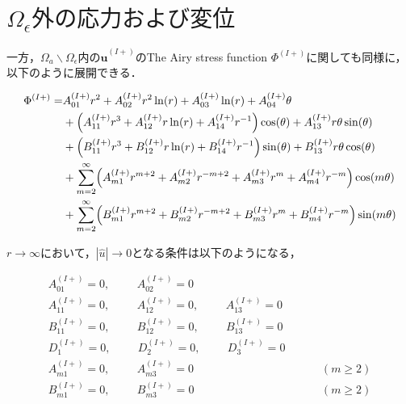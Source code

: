 \section{$\Omega_{\epsilon}外の応力および変位$}

一方，$\Omega_{a}\backslash\Omega_\epsilon$内の$\hat{\bm{u}}^{(I+)}$のThe Airy stress function $\Phi^{(I+)}$に関しても同様に，以下のように展開できる．

\begin{align}
\Phi^{(I+)} =&A_{01}^{(I+)}r^2+A_{02}^{(I+)}r^2\ln(r)+A_{03}^{(I+)}\ln(r)+A_{04}^{(I+)}\theta
\nonumber
\\
&+\Bigl(A_{11}^{(I+)}r^3+A_{12}^{(I+)}r\ln(r)+A_{14}^{(I+)}r^{-1}\Bigr)\cos(\theta)+A_{13}^{(I+)}r\theta \sin(\theta)
\nonumber
\\
&+\Bigl(B_{11}^{(I+)}r^3+B_{12}^{(I+)}r\ln(r)+B_{14}^{(I+)}r^{-1}\Bigr)\sin(\theta)+B_{13}^{(I+)}r\theta \cos(\theta)
\nonumber
\\
&+\sum_{m=2}^{\infty}\Bigl(A_{m1}^{(I+)}r^{m+2}+A_{m2}^{(I+)}r^{-m+2}
+A_{m3}^{(I+)}r^{m}+A_{m4}^{(I+)}r^{-m}\Bigr)\cos(m\theta)
\nonumber
\\
&+\sum_{m=2}^{\infty}\Bigl(B_{m1}^{(I+)}r^{m+2}+B_{m2}^{(I+)}r^{-m+2}
+B_{m3}^{(I+)}r^{m}+B_{m4}^{(I+)}r^{-m}\Bigr)\sin(m\theta)
\label{eq:AiryOut1}
\end{align}


$r\rightarrow\infty$において，$|\hat{u}|\rightarrow0$となる条件は以下のようになる，

\begin{align}
A_{01}^{(I+)}=0,\hspace{1cm}A_{02}^{(I+)}=0&
\nonumber
\\
A_{11}^{(I+)}=0,\hspace{1cm}A_{12}^{(I+)}=0,\hspace{1cm}A_{13}^{(I+)}=0&
\nonumber
\\
B_{11}^{(I+)}=0,\hspace{1cm}B_{12}^{(I+)}=0,\hspace{1cm}B_{13}^{(I+)}=0&
\nonumber
\\
D_{1}^{(I+)}=0,\hspace{1cm}
D_{2}^{(I+)}=0,\hspace{1cm}
D_{3}^{(I+)}=0&
\nonumber
\\
A_{m1}^{(I+)}=0,\hspace{1cm}A_{m3}^{(I+)}=0&\hspace{1cm}(m\geq2)
\nonumber
\\
B_{m1}^{(I+)}=0,\hspace{1cm}B_{m3}^{(I+)}=0&\hspace{1cm}(m\geq2)
\label{eq:ConOut1}
\end{align}


